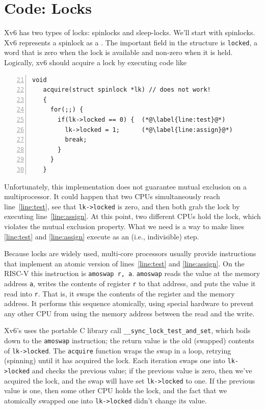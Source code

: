 \section{Code: Locks}
Xv6 has two types of locks: spinlocks and sleep-locks.
We'll start with spinlocks.
Xv6 represents a spinlock as a
.
The important field in the structure is
\lstinline{locked},
a word that is zero when the lock is available
and non-zero when it is held.
Logically, xv6 should acquire a lock by executing code like
\begin{lstlisting}[numbers=left,firstnumber=21]
   void
   acquire(struct spinlock *lk) // does not work!
   {
     for(;;) {
       if(lk->locked == 0) {  (*@\label{line:test}@*)
         lk->locked = 1;      (*@\label{line:assign}@*)
         break;
       }
     }
   }
\end{lstlisting}
Unfortunately, this implementation does not
guarantee mutual exclusion on a multiprocessor.
It could happen that two CPUs simultaneously
reach line~\ref{line:test}, see that 
\lstinline{lk->locked}
is zero, and then both grab the lock by executing line~\ref{line:assign}.
At this point, two different CPUs hold the lock,
which violates the mutual exclusion property.
What we need is a way to
make lines \ref{line:test} and \ref{line:assign} execute as an
(i.e., indivisible) step.

Because locks are widely used,
multi-core processors usually provide instructions that
implement an atomic version of
lines~\ref{line:test} and \ref{line:assign}.
On the RISC-V this instruction is
\lstinline{amoswap r, a}.
\lstinline{amoswap}
reads the value at the memory address {\tt a},
writes the contents of register {\tt r} to that address,
and puts the value it read into {\tt r}.
That is, it swaps the contents of the register and the memory address.
It performs this sequence atomically, using special
hardware to prevent any
other CPU from using the memory address between the read and the write.

Xv6's 
uses the portable C library call 
\lstinline{__sync_lock_test_and_set},
which boils down to the
\lstinline{amoswap}
instruction;
the return value is the old (swapped) contents of
\lstinline{lk->locked}.
The
\lstinline{acquire}
function wraps the swap in a loop, retrying (spinning) until it has
acquired the lock.
Each iteration swaps one into
\lstinline{lk->locked} 
and checks the previous value;
if the previous value is zero, then we've acquired the
lock, and the swap will have set 
\lstinline{lk->locked}
to one.
If the previous value is one, then some other CPU
holds the lock, and the fact that we atomically swapped one into
\lstinline{lk->locked}
didn't change its value.

